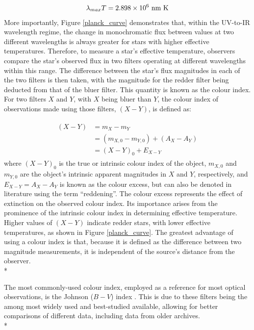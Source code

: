 \documentclass[12pt, a4paper]{report}
\begin{document}
\begin{equation}
\lambda_{max} T = 2.898 \times 10^{6} \textnormal{ nm K}
\label{wien_eq}
\end{equation}
More importantly, Figure \ref{planck_curve} demonstrates that, within the UV-to-IR wavelength regime, the change in monochromatic flux between values at two different wavelengths is always greater for stars with higher effective temperatures. Therefore, to measure a star's effective temperature, observers compare the star's observed flux in two filters operating at different wavelengths within this range. The difference between the star's flux magnitudes in each of the two filters is then taken, with the magnitude for the redder filter being deducted from that of the bluer filter. This quantity is known as the colour index. For two filters $X$ and $Y$, with $X$ being bluer than $Y$, the colour index of observations made using those filters, $(X-Y)$, is defined as:

\begin{align}
\begin{split}
(X-Y) &= m_{X} - m_{Y} \\
 &= (m_{X,0} - m_{Y,0}) + (A_{X} - A_{Y}) \\
 &= (X-Y)_{0} + E_{X-Y}
\end{split}
\label{colour_index}
\end{align}
where $(X-Y)_{0}$ is the true or intrinsic colour index of the object, $m_{X,0}$ and $m_{Y,0}$ are the object's intrinsic apparent magnitudes in $X$ and $Y$, respectively, and $E_{X-Y} = A_{X} - A_{Y}$ is known as the colour excess, but can also be denoted in literature using the term ``reddening''. The colour excess represents the effect of extinction on the observed colour index. Its importance arises from the prominence of the intrinsic colour index in determining effective temperature. Higher values of $(X-Y)$ indicate redder stars, with lower effective temperatures, as shown in Figure \ref{planck_curve}. The greatest advantage of using a colour index is that, because it is defined as the difference between two magnitude measurements, it is independent of the source's distance from the observer.\\*

The most commonly-used colour index, employed as a reference for most optical observations, is the Johnson ($B-V$) index \citep{1953ApJ...117..313J}. This is due to these filters being the among most widely used and best-studied available, allowing for better comparisons of different data, including data from older archives.\\*
\end{document}
